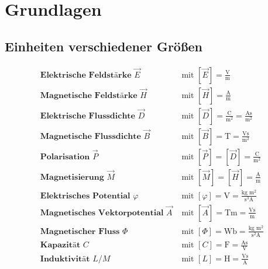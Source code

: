 \chapter{Grundlagen}
 \section{Einheiten verschiedener Größen}
 \begin{minipage}{\textwidth}
   {%
    \savebox{}
    \begin{align}
	    \textbf{Elektrische Feldstärke }\vec{E}        & \text{ mit }\left[\vec{E}\right] =\mathrm{ \frac{V}{m} }                            \\
	    \textbf{Magnetische Feldstärke }\vec{H}        & \text{ mit }\left[\vec{H}\right]=\mathrm{ \frac{A}{m} }                             \\
	    \textbf{Elektrische Flussdichte }\vec{D}       & \text{ mit }\left[\vec{D}\right] =\mathrm{ \frac{C}{m^{2}} = \frac{A s}{m^{2}}}     \\
	    \textbf{Magnetische Flussdichte }\vec{B}       & \text{ mit }\left[\vec{B}\right] =\mathrm{ T = \frac{V s}{m^{2}} }                  \\
	    \textbf{Polarisation }\vec{P}                  & \text{ mit }\left[\vec{P}\right] = \left[\vec{D}\right] = \mathrm{\frac{C}{m^{2}} } \\
	    \textbf{Magnetisierung }\vec{M}                & \text{ mit }\left[\vec{M}\right] = \left[\vec{H}\right] =\mathrm{ \frac{A}{m}}      \\
	    \textbf{Elektrisches Potential }\varphi        & \text{ mit }\left[\varphi\right] =\mathrm{ V = \frac{\text{kg }m^{2}}{s^{3} A} }    \\
	    \textbf{Magnetisches Vektorpotential }\vec{A}  & \text{ mit }\left[\vec{A}\right] =\mathrm{ T m = \frac{V s}{m} }                    \\
	    \textbf{Magnetischer Fluss }\Phi               & \text{ mit }\left[\Phi\right] =\mathrm{ Wb = \frac{\text{kg }m^{2}}{s^{2} A}}       \\
	    \textbf{Kapazität }C                           & \text{ mit }\left[C\right] =\mathrm{ F = \frac{A s}{V}}                             \\
	    \textbf{Induktivität }L   / M                  & \text{ mit }\left[L\right] =\mathrm{ H = \frac{V s}{A} }                            \\

\end{align}}
\end{minipage}
